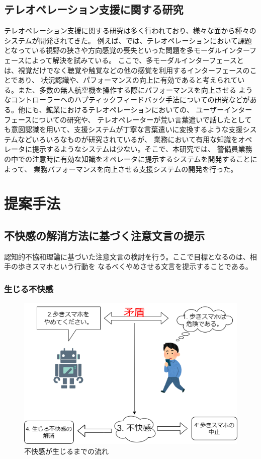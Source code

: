 \documentclass[11pt,a4j]{jreport}
\begin{document}
\section{テレオペレーション支援に関する研究}
テレオペレーション支援に関する研究は多く行われており、様々な面から種々のシステムが開発されてきた。
例えば、\cite{chen2007human,triantafyllidis2020study}では、テレオペレーションにおいて課題となっている視野の狭さや方向感覚の喪失といった問題を多モーダルインターフェースによって解決を試みている。
ここで、多モーダルインターフェースとは、視覚だけでなく聴覚や触覚などの他の感覚を利用するインターフェースのことであり、
状況認識や、パフォーマンスの向上に有効であると考えられている。また、多数の無人航空機を操作する際にパフォーマンスを向上させる
ようなコントローラーへのハプティックフィードバック手法についての研究\cite{son2011measuring}などがある。他にも、鉱業におけるテレオペレーションにおいての、
ユーザーインターフェースについての研究\cite{hainsworth2001teleoperation}や、
テレオペレーターが荒い言葉遣いで話したとしても意図認識を用いて、支援システムが丁寧な言葉遣いに変換するような支援システム\cite{Daneshmand2023}などいろいろなものが研究されているが、
業務において有用な知識をオペレータに提示するようなシステムは少ない。そこで、本研究では、
警備員業務の中での注意時に有効な知識をオペレータに提示するシステムを開発することによって、
業務パフォーマンスを向上させる支援システムの開発を行った。


\chapter{提案手法}
\section{不快感の解消方法に基づく注意文言の提示}
認知的不協和理論に基づいた注意文言の検討を行う。ここで目標となるのは、相手の歩きスマホという行動を
なるべくやめさせる文言を提示することである。
\subsection{生じる不快感}
\label{sec: dissonance}
\begin{figure}[htbp]
  \label{fig: dissonance}
  \includegraphics[width=13cm]{img/CDT.png}
  \caption{不快感が生じるまでの流れ}
\end{figure}
\end{document}
